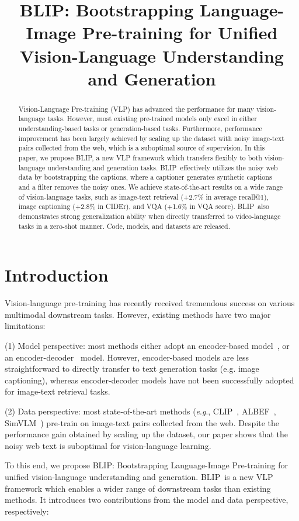 \title{BLIP: Bootstrapping Language-Image Pre-training for Unified Vision-Language Understanding and Generation}

\begin{abstract}
Vision-Language Pre-training (VLP) has advanced the performance for many vision-language tasks. However, most existing pre-trained models only excel in either understanding-based tasks or generation-based tasks. Furthermore, performance improvement has been largely achieved by scaling up the dataset with noisy image-text pairs collected from the web, which is a suboptimal source of supervision. In this paper, we propose BLIP, a new VLP framework which transfers flexibly to both vision-language understanding and generation tasks. BLIP~effectively utilizes the noisy web data by bootstrapping the captions, where a captioner generates synthetic captions and a filter removes the noisy ones. We achieve state-of-the-art results on a wide range of vision-language tasks, such as image-text retrieval (+2.7\% in average recall@1), image captioning (+2.8\% in CIDEr), and VQA (+1.6\% in VQA score). BLIP~also demonstrates strong generalization ability when directly transferred to video-language tasks in a zero-shot manner. Code, models, and datasets are released.
\end{abstract}

\section{Introduction}
Vision-language pre-training has recently received tremendous success on various multimodal downstream tasks. However, existing methods have two major limitations:

(1) Model perspective: most methods either adopt an encoder-based model~\cite{clip,ALBEF}, or an encoder-decoder~\cite{VL_T5,simvlm} model. However, encoder-based models are less straightforward to directly transfer to text generation tasks (e.g. image captioning), whereas encoder-decoder models have not been successfully adopted for image-text retrieval tasks.

(2) Data perspective: most state-of-the-art methods (\textit{e}.\textit{g}., CLIP~\cite{clip}, ALBEF~\cite{ALBEF}, SimVLM~\cite{simvlm}) pre-train on image-text pairs collected from the web. Despite the performance gain obtained by scaling up the dataset, our paper shows that the noisy web text is suboptimal for vision-language learning.

To this end, we propose BLIP: Bootstrapping Language-Image Pre-training for unified vision-language understanding and generation. BLIP~is a new VLP framework which enables a wider range of downstream tasks than existing methods. It introduces two contributions from the model and data perspective, respectively:

